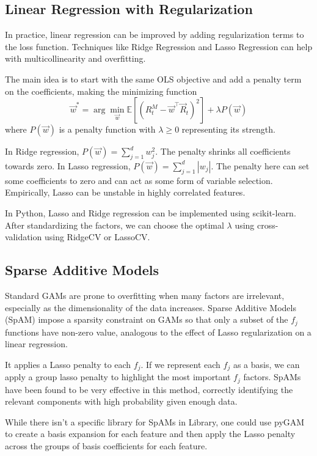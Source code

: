 \subsection{Linear Regression with Regularization}

In practice, linear regression can be improved by adding regularization terms to the loss function. Techniques like Ridge Regression and Lasso Regression can help with multicollinearity and overfitting.

The main idea is to start with the same OLS objective and add a penalty term on the coefficients, making the minimizing function $$\vec{w}^*=\arg\min_{\vec{w}}\mathbb{E}\left[\left(R_t^M-\vec{w}^\top \vec{R}_t\right)^2\right]+\lambda P(\vec{w})$$ where $P(\vec{w})$ is a penalty function with $\lambda \ge 0$ representing its strength.

In Ridge regression, $P(\vec{w})=\sum_{j=1}^d w_j^2$. The penalty shrinks all coefficients towards zero. In Lasso regression, $P(\vec{w})=\sum_{j=1}^d |w_j|$. The penalty here can set some coefficients to zero and can act as some form of variable selection. Empirically, Lasso can be unstable in highly correlated features.

In Python, Lasso and Ridge regression can be implemented using scikit-learn. After standardizing the factors, we can choose the optimal $\lambda$ using cross-validation using RidgeCV or LassoCV.

\subsection{Sparse Additive Models}

Standard GAMs are prone to overfitting when many factors are irrelevant, especially as the dimensionality of the data increases. Sparse Additive Models (SpAM) impose a sparsity constraint on GAMs so that only a subset of the $f_j$ functions have non-zero value, analogous to the effect of Lasso regularization on a linear regression.

It applies a Lasso penalty to each $f_j$. If we represent each $f_j$ as a basis, we can apply a group lasso penalty to highlight the most important $f_j$ factors. SpAMs have been found to be very effective in this method, correctly identifying the relevant components with high probability given enough data. 

While there isn't a specific library for SpAMs in Library, one could use pyGAM to create a basis expansion for each feature and then apply the Lasso penalty across the groups of basis coefficients for each feature.

